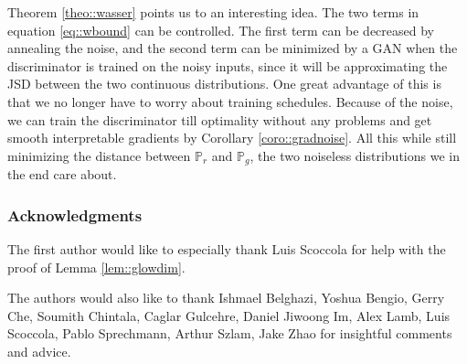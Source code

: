 \documentclass{article} %
\newcommand\PP{\mathbb{P}}
\theoremstyle{definition}
\begin{document}
Theorem \autoref{theo::wasser} points us to an interesting idea. The
two terms in equation \eqref{eq::wbound} can be controlled. The first
term can be decreased by annealing the noise, and the second
term can be minimized by a GAN when the discriminator is trained
on the noisy inputs, since it will be approximating the JSD
between the two continuous distributions. One great advantage
of this is that we no longer have to worry about training schedules.
Because of the noise, we can train the discriminator
till optimality without any problems and get smooth interpretable
gradients by Corollary \autoref{coro::gradnoise}. All this while
still minimizing the distance between $\PP_r$ and $\PP_g$, the two
noiseless distributions we in the end care about.

\subsubsection*{Acknowledgments}

The first author would like to especially thank Luis Scoccola
for help with the proof of Lemma \autoref{lem::glowdim}.

The authors would also like to thank
Ishmael Belghazi,
Yoshua Bengio,
Gerry Che,
Soumith Chintala,
Caglar Gulcehre,
Daniel Jiwoong Im,
Alex Lamb,
Luis Scoccola,
Pablo Sprechmann,
Arthur Szlam,
Jake Zhao
for insightful comments and advice.
%


\end{document}
